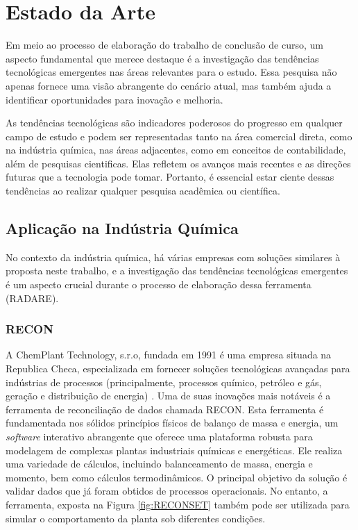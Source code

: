 \section{Estado da Arte}

Em meio ao processo de elaboração do trabalho de conclusão de curso, um aspecto fundamental que merece destaque é a investigação das tendências tecnológicas emergentes nas áreas relevantes para o estudo. Essa pesquisa não apenas fornece uma visão abrangente do cenário atual, mas também ajuda a identificar oportunidades para inovação e melhoria.

As tendências tecnológicas são indicadores poderosos do progresso em qualquer campo de estudo e podem ser representadas tanto na área comercial direta, como na indústria química, nas áreas adjacentes, como em conceitos de contabilidade, além de pesquisas cientificas. Elas refletem os avanços mais recentes e as direções futuras que a tecnologia pode tomar. Portanto, é essencial estar ciente dessas tendências ao realizar qualquer pesquisa acadêmica ou científica.

\subsection{Aplicação na Indústria Química}

No contexto da indústria química, há várias empresas com soluções similares à proposta neste trabalho, e a investigação das tendências tecnológicas emergentes é um aspecto crucial durante o processo de elaboração dessa ferramenta (RADARE). 

\subsubsection{RECON}

A ChemPlant Technology, s.r.o, fundada em 1991 é uma empresa situada na Republica Checa, especializada em fornecer soluções tecnológicas avançadas para indústrias de processos (principalmente, processos químico, petróleo e gás, geração e distribuição de energia) \cite{reconset}. Uma de suas inovações mais notáveis é a ferramenta de reconciliação de dados chamada RECON. Esta ferramenta é fundamentada nos sólidos princípios físicos de balanço de massa e energia, um \textit{software} interativo abrangente que oferece uma plataforma robusta para modelagem de complexas plantas industriais químicas e energéticas. Ele realiza uma variedade de cálculos, incluindo balanceamento de massa, energia e momento, bem como cálculos termodinâmicos. O principal objetivo da solução é validar dados que já foram obtidos de processos operacionais. No entanto, a ferramenta, exposta na Figura \ref{fig:RECONSET} também pode ser utilizada para simular o comportamento da planta sob diferentes condições.

